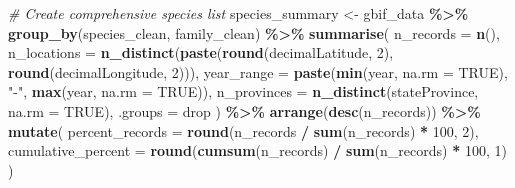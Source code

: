 \documentclass[
]{article}
\newenvironment{Shaded}{\begin{snugshade}}{\end{snugshade}}
\newcommand{\AttributeTok}[1]{\textcolor[rgb]{0.13,0.29,0.53}{#1}}
\newcommand{\CommentTok}[1]{\textcolor[rgb]{0.56,0.35,0.01}{\textit{#1}}}
\newcommand{\ConstantTok}[1]{\textcolor[rgb]{0.56,0.35,0.01}{#1}}
\newcommand{\DecValTok}[1]{\textcolor[rgb]{0.00,0.00,0.81}{#1}}
\newcommand{\FunctionTok}[1]{\textcolor[rgb]{0.13,0.29,0.53}{\textbf{#1}}}
\newcommand{\NormalTok}[1]{#1}
\newcommand{\OtherTok}[1]{\textcolor[rgb]{0.56,0.35,0.01}{#1}}
\newcommand{\SpecialCharTok}[1]{\textcolor[rgb]{0.81,0.36,0.00}{\textbf{#1}}}
\newcommand{\StringTok}[1]{\textcolor[rgb]{0.31,0.60,0.02}{#1}}
\begin{document}
\begin{Shaded}
\begin{Highlighting}[]
\CommentTok{\# Create comprehensive species list}
\NormalTok{species\_summary }\OtherTok{\textless{}{-}}\NormalTok{ gbif\_data }\SpecialCharTok{\%\textgreater{}\%}
  \FunctionTok{group\_by}\NormalTok{(species\_clean, family\_clean) }\SpecialCharTok{\%\textgreater{}\%}
  \FunctionTok{summarise}\NormalTok{(}
    \AttributeTok{n\_records =} \FunctionTok{n}\NormalTok{(),}
    \AttributeTok{n\_locations =} \FunctionTok{n\_distinct}\NormalTok{(}\FunctionTok{paste}\NormalTok{(}\FunctionTok{round}\NormalTok{(decimalLatitude, }\DecValTok{2}\NormalTok{), }
                                   \FunctionTok{round}\NormalTok{(decimalLongitude, }\DecValTok{2}\NormalTok{))),}
    \AttributeTok{year\_range =} \FunctionTok{paste}\NormalTok{(}\FunctionTok{min}\NormalTok{(year, }\AttributeTok{na.rm =} \ConstantTok{TRUE}\NormalTok{), }\StringTok{"{-}"}\NormalTok{, }
                      \FunctionTok{max}\NormalTok{(year, }\AttributeTok{na.rm =} \ConstantTok{TRUE}\NormalTok{)),}
    \AttributeTok{n\_provinces =} \FunctionTok{n\_distinct}\NormalTok{(stateProvince, }\AttributeTok{na.rm =} \ConstantTok{TRUE}\NormalTok{),}
    \AttributeTok{.groups =} \StringTok{\textquotesingle{}drop\textquotesingle{}}
\NormalTok{  ) }\SpecialCharTok{\%\textgreater{}\%}
  \FunctionTok{arrange}\NormalTok{(}\FunctionTok{desc}\NormalTok{(n\_records)) }\SpecialCharTok{\%\textgreater{}\%}
  \FunctionTok{mutate}\NormalTok{(}
    \AttributeTok{percent\_records =} \FunctionTok{round}\NormalTok{(n\_records }\SpecialCharTok{/} \FunctionTok{sum}\NormalTok{(n\_records) }\SpecialCharTok{*} \DecValTok{100}\NormalTok{, }\DecValTok{2}\NormalTok{),}
    \AttributeTok{cumulative\_percent =} \FunctionTok{round}\NormalTok{(}\FunctionTok{cumsum}\NormalTok{(n\_records) }\SpecialCharTok{/} \FunctionTok{sum}\NormalTok{(n\_records) }\SpecialCharTok{*} \DecValTok{100}\NormalTok{, }\DecValTok{1}\NormalTok{)}
\NormalTok{  )}


\end{Highlighting}
\end{Shaded}
\end{document}
